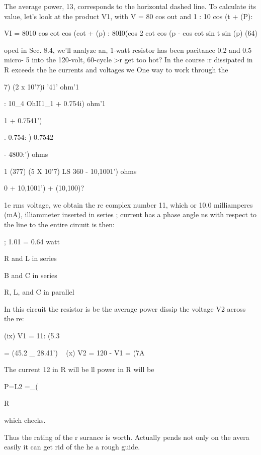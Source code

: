 The average power, 13, corresponds to the horizontal dashed line.
To calculate its value, let's look at the product V1, with V = 80 cos out
and 1 : 10 cos (\omega t + (P):

\begin{equation}
\end{equation}
VI = 8010 cos cot cos (cot + (p)
: 80I0(cos 2 cot cos (p - cos cot sin \omega t sin (p) (64)

oped in Sec. 8.4, we'll analyze
an, 1-watt resistor has been
pacitance 0.2 and 0.5 micro-
5 into the 120-volt, 60-cycle
>r get too hot? In the course
:r dissipated in R exceeds the
he currents and voltages we
One way to work through the

7) (2 x 10'7)i
'41' ohm'1

: 10_4 OhII1_1
+ 0.754i) ohm'1

1
+ 0.7541')

. 0.754:-)
0.7542

- 4800:') ohms

1
(377) (5 X 10'7)
LS
360 - 10,1001') ohms

0 + 10,1001')
+ (10,100)?

1e rms voltage, we obtain the
re complex number 11, which
or 10.0 milliamperes (mA),
illiammeter inserted in series
; current has a phase angle
ns with respect to the line
to the entire circuit is then:

; 1.01 = 0.64 watt

R and L in series

B and C in series

R, L, and C in parallel

In this circuit the resistor is
be the average power dissip
the voltage V2 across the re:

\begin{equation}
\end{equation}
(ix) V1 = 11: (5.3

= (45.2 _ 28.41') ~
(x) V2 = 120 - V1 = (7A

The current 12 in R will be ll
power in R will be

\begin{equation}
\end{equation}
P=L2 =_(

R

which checks.

Thus the rating of the r
surance is worth. Actually
pends not only on the avera
easily it can get rid of the he
a rough guide.

\fi
